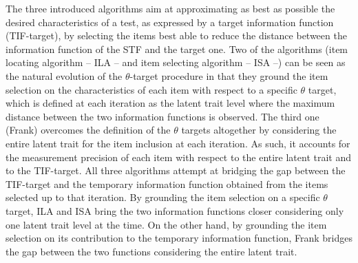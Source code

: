 \documentclass[12pt, a4paper, titilepage]{article}
\begin{document}
The three introduced algorithms aim at approximating as best as possible the desired characteristics of a test, as expressed by a target information function (TIF-target), by selecting the items best able to reduce the distance between the information function of the STF and the target one. 
Two of the algorithms (item locating algorithm -- ILA -- and item selecting algorithm -- ISA --) can be seen as the natural evolution of the $\theta$-target procedure in that they ground the item selection on the characteristics of each item with respect to a specific $\theta$ target, which is defined at each iteration as the latent trait level where the maximum distance between the two information functions is observed.
The third one (Frank) overcomes the definition of the $\theta$ targets altogether by considering the entire latent trait for the item inclusion at each iteration. As such, it accounts for the measurement precision of each item with respect to the entire latent trait and to the TIF-target. 
All three algorithms attempt at bridging the gap between the TIF-target and the temporary information function obtained from the items selected up to that iteration. 
By grounding the item selection on a specific $\theta$ target, ILA and ISA bring the two information functions closer considering only one latent trait level at the time. 
On the other hand, by grounding the item selection on its contribution to the temporary information function, Frank bridges the gap between the two functions considering the entire latent trait. 
\normalcolor
\end{document}

